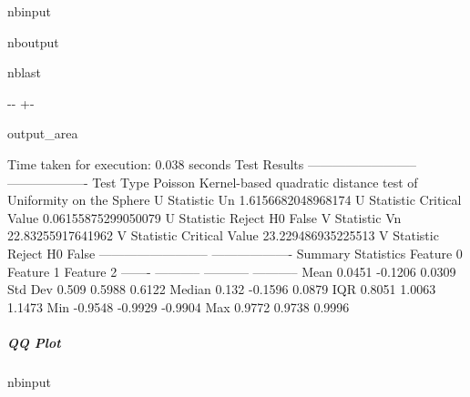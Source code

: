 \documentclass[letterpaper,10pt,english,openany,oneside]{sphinxmanual}
\begin{document}
{{{{\begin{sphinxuseclass}{nbinput}
\end{sphinxuseclass}
\begin{sphinxuseclass}{nboutput}
\begin{sphinxuseclass}{nblast}
{

\kern-\sphinxverbatimsmallskipamount\kern-\baselineskip
\kern+\FrameHeightAdjust\kern-\fboxrule
\vspace{\nbsphinxcodecellspacing}

\begin{sphinxuseclass}{output_area}
\begin{sphinxuseclass}{}


\begin{sphinxVerbatim}[commandchars=\\\{\}]
Time taken for execution: 0.038 seconds
Test Results
--------------------------  -------------------
Test Type                   Poisson Kernel-based quadratic
 distance test of Uniformity on the Sphere
U Statistic Un              1.6156682048968174
U Statistic Critical Value  0.06155875299050079
U Statistic Reject H0       False
V Statistic Vn              22.83255917641962
V Statistic Critical Value  23.229486935225513
V Statistic Reject H0       False
--------------------------  -------------------
Summary Statistics
           Feature 0    Feature 1    Feature 2
-------  -----------  -----------  -----------
Mean          0.0451      -0.1206       0.0309
Std Dev       0.509        0.5988       0.6122
Median        0.132       -0.1596       0.0879
IQR           0.8051       1.0063       1.1473
Min          -0.9548      -0.9929      -0.9904
Max           0.9772       0.9738       0.9996
\end{sphinxVerbatim}



\end{sphinxuseclass}
\end{sphinxuseclass}
}

\end{sphinxuseclass}
\end{sphinxuseclass}

\subparagraph{QQ Plot}
\label{\detokenize{user_guide/basic_usage:id1}}
\begin{sphinxuseclass}{nbinput}
{
\begin{sphinxVerbatim}[commandchars=\\\{\}]
\llap{\color{nbsphinxin}[13]:\,\hspace{\fboxrule}\hspace{\fboxsep}}   


\end{sphinxVerbatim}}
\end{sphinxuseclass}}}}}
\end{document}
